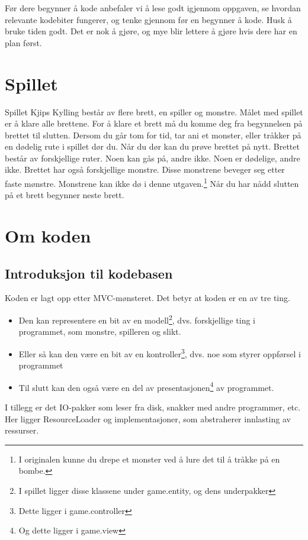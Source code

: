 \documentclass[norsk]{article}
\begin{document}
Før dere begynner å kode anbefaler vi å lese godt igjennom oppgaven, se hvordan relevante kodebiter fungerer, og tenke gjennom før en begynner å kode.
Husk å bruke tiden godt. Det er nok å gjøre, og mye blir lettere å gjøre hvis dere har en plan først. %

\section{Spillet}
\label{sec:spillet}
Spillet Kjips Kylling består av flere brett, en spiller og monstre.
Målet med spillet er å klare alle brettene.
For å klare et brett må du komme deg fra begynnelsen på brettet til slutten.
Dersom du går tom for tid, tar ani et monster, eller tråkker på en dødelig rute i spillet dør du.
Når du dør kan du prøve brettet på nytt.
Brettet består av forskjellige ruter. Noen kan gås på, andre ikke. Noen er dødelige, andre ikke.
Brettet har også forskjellige monstre. Disse monstrene beveger seg etter faste mønstre. Monstrene kan ikke dø i denne utgaven.\footnote{I originalen kunne du drepe et monster ved å lure det til å tråkke på en bombe.}
Når du har nådd slutten på et brett begynner neste brett.

\section{Om koden}
\label{sec:om-koden}
\subsection{Introduksjon til kodebasen}
\label{subsec:kodebase-intro}
Koden er lagt opp etter MVC-mønsteret. Det betyr at koden er en av tre ting.
\begin{itemize}
\item Den kan representere en bit av en modell\footnote{I spillet ligger disse klassene under game.entity, og dens underpakker}, dvs. forskjellige ting i programmet, som monstre, spilleren og slikt.
\item Eller så kan den være en bit av en kontroller\footnote{Dette ligger i game.controller}, dvs. noe som styrer oppførsel i programmet
\item Til slutt kan den også være en del av presentasjonen\footnote{Og dette ligger i game.view} av programmet.
\end{itemize}
I tillegg er det IO-pakker som leser fra disk, snakker med andre programmer, etc.
Her ligger ResourceLoader og implementasjoner, som abstraherer innlasting av ressurser.
\end{document}
